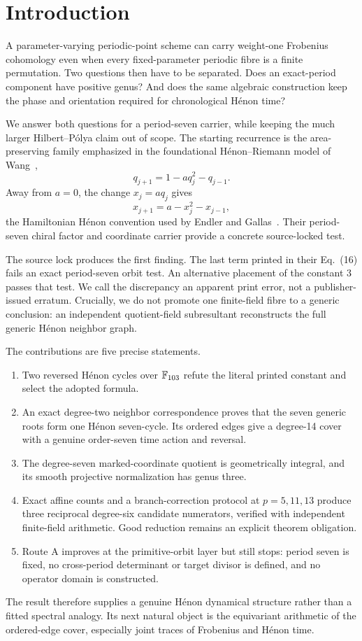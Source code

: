\section{Introduction}

A parameter-varying periodic-point scheme can carry weight-one Frobenius
cohomology even when every fixed-parameter periodic fibre is a finite
permutation.  Two questions then have to be separated.  Does an exact-period
component have positive genus?  And does the same algebraic construction keep
the phase and orientation required for chronological H\'enon time?

We answer both questions for a period-seven carrier, while keeping the much
larger Hilbert--P\'olya claim out of scope.  The starting recurrence is the
area-preserving family emphasized in the foundational H\'enon--Riemann model
of Wang~\cite{wang2026henon},
\begin{equation}\label{eq:paper5}
 q_{j+1}=1-aq_j^2-q_{j-1}.
\end{equation}
Away from $a=0$, the change $x_j=aq_j$ gives
\begin{equation}\label{eq:hamiltonian}
 x_{j+1}=a-x_j^2-x_{j-1},
\end{equation}
the Hamiltonian H\'enon convention used by Endler and
Gallas~\cite{endler2006chiral}.  Their period-seven chiral factor and
coordinate carrier provide a concrete source-locked test.

The source lock produces the first finding.  The last term printed in their
Eq.~(16) fails an exact period-seven orbit test.  An alternative placement of
the constant $3$ passes that test.  We call the discrepancy an apparent print
error, not a publisher-issued erratum.  Crucially, we do not promote one
finite-field fibre to a generic conclusion: an independent quotient-field
subresultant reconstructs the full generic H\'enon neighbor graph.

The contributions are five precise statements.
\begin{enumerate}
 \item Two reversed H\'enon cycles over $\mathbb F_{103}$ refute the literal printed
 constant and select the adopted formula.
 \item An exact degree-two neighbor correspondence proves that the seven
 generic roots form one H\'enon seven-cycle.  Its ordered edges give a
 degree-14 cover with a genuine order-seven time action and reversal.
 \item The degree-seven marked-coordinate quotient is geometrically integral,
 and its smooth projective normalization has genus three.
 \item Exact affine counts and a branch-correction protocol at
 $p=5,11,13$ produce three reciprocal degree-six candidate numerators,
 verified with independent finite-field arithmetic.  Good reduction remains
 an explicit theorem obligation.
 \item Route A improves at the primitive-orbit layer but still stops: period
 seven is fixed, no cross-period determinant or target divisor is defined,
 and no operator domain is constructed.
\end{enumerate}

The result therefore supplies a genuine H\'enon dynamical structure rather
than a fitted spectral analogy.  Its next natural object is the equivariant
arithmetic of the ordered-edge cover, especially joint traces of Frobenius
and H\'enon time.
